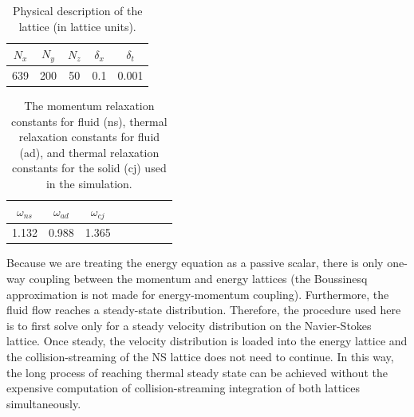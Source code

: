 
\begin {table}[h] %
\caption{Physical description of the lattice (in lattice units).}
\label{tab:lbm-parameters} \centering %
\begin {tabular}{ ccccc }
\toprule %
$N_x$   &   $N_y$  &   $N_z$    &   $\delta_x$   & $\delta_t$    \\\toprule
639      &   200     &   50     &    0.1         &  0.001        \\\bottomrule
\end{tabular}
\end{table}

\begin {table}[h] %
\caption{The momentum relaxation constants for fluid (ns), thermal relaxation constants for fluid (ad), and thermal relaxation constants for the solid (cj) used in the simulation.}
\label{tab:lbm-relaxations} \centering %
\begin {tabular}{ cccccccc }
\toprule %
$\omega_{ns}$ &  $\omega_{ad}$  &   $\omega_{cj}$     \\\toprule
1.132      &  0.988       &   1.365          \\\bottomrule
\end{tabular}
\end{table}

Because we are treating the energy equation as a passive scalar, there is only one-way coupling between the momentum and energy lattices (the Boussinesq approximation is not made for energy-momentum coupling). Furthermore, the fluid flow reaches a steady-state distribution. Therefore, the procedure used here is to first solve only for a steady velocity distribution on the Navier-Stokes lattice. Once steady, the velocity distribution is loaded into the energy lattice and the collision-streaming of the NS lattice does not need to continue. In this way, the long process of reaching thermal steady state can be achieved without the expensive computation of collision-streaming integration of both lattices simultaneously.



